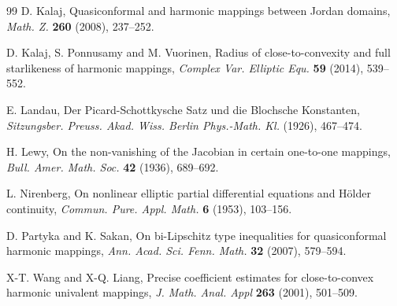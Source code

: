 \documentclass[a4paper,12pt]{amsart}
\theoremstyle{plain}
\theoremstyle{definition}
\begin{document}
\begin{thebibliography}{99}
    {\sc D. Kalaj}, Quasiconformal and harmonic mappings between Jordan domains, {\it  Math. Z.} {\bf 260} (2008), 237--252.
   
{\sc D. Kalaj,  S. Ponnusamy} and {\sc M. Vuorinen}, Radius of close-to-convexity and full starlikeness of harmonic mappings, {\it Complex Var. Elliptic Equ.} {\bf 59} (2014), 539--552.

     {\sc E. Landau}, Der Picard-Schottkysche Satz und die Blochsche Konstanten, {\it  Sitzungsber.
Preuss. Akad. Wiss. Berlin Phys.-Math. Kl.} (1926), 467--474.

   {\sc H. Lewy}, On the non-vanishing of the Jacobian in certain one-to-one mappings, {\it  Bull. Amer. Math. Soc.} {\bf 42} (1936), 689--692. 
    
  

  
     {\sc L. Nirenberg}, On nonlinear elliptic partial differential equations and H\"{o}lder continuity, {\it  Commun. Pure. Appl. Math.} {\bf 6} (1953), 103--156.

    {\sc D. Partyka} and {\sc  K. Sakan}, On  bi-Lipschitz type inequalities for quasiconformal harmonic mappings, {\it  Ann. Acad. Sci. Fenn. Math.} {\bf 32} (2007), 579--594.

{\sc X-T. Wang} and {\sc X-Q. Liang}, Precise coefficient estimates for close-to-convex harmonic univalent mappings, {\it J. Math. Anal. Appl} {\bf 263} (2001), 501--509.




\end{thebibliography}
\end{document}
